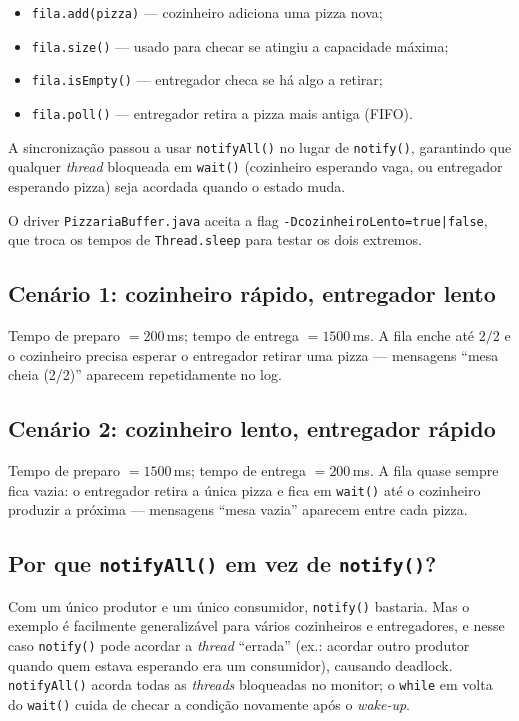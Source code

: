 \begin{itemize}[noitemsep, topsep=2pt, leftmargin=*]
  \item \texttt{fila.add(pizza)} --- cozinheiro adiciona uma pizza nova;
  \item \texttt{fila.size()} --- usado para checar se atingiu a capacidade máxima;
  \item \texttt{fila.isEmpty()} --- entregador checa se há algo a retirar;
  \item \texttt{fila.poll()} --- entregador retira a pizza mais antiga (FIFO).
\end{itemize}

A sincronização passou a usar \texttt{notifyAll()} no lugar de
\texttt{notify()}, garantindo que qualquer \textit{thread} bloqueada em
\texttt{wait()} (cozinheiro esperando vaga, ou entregador esperando
pizza) seja acordada quando o estado muda.

O driver \texttt{PizzariaBuffer.java} aceita a flag
\texttt{-DcozinheiroLento=true|false}, que troca os tempos de
\texttt{Thread.sleep} para testar os dois extremos.

\subsection{Cenário 1: cozinheiro rápido, entregador lento}

Tempo de preparo $= 200$\,ms; tempo de entrega $= 1500$\,ms. A fila
enche até $2/2$ e o cozinheiro precisa esperar o entregador retirar uma
pizza --- mensagens ``mesa cheia (2/2)'' aparecem repetidamente no log.

\subsection{Cenário 2: cozinheiro lento, entregador rápido}

Tempo de preparo $= 1500$\,ms; tempo de entrega $= 200$\,ms. A fila quase
sempre fica vazia: o entregador retira a única pizza e fica em
\texttt{wait()} até o cozinheiro produzir a próxima --- mensagens
``mesa vazia'' aparecem entre cada pizza.

\subsection{Por que \texttt{notifyAll()} em vez de \texttt{notify()}?}

Com um único produtor e um único consumidor, \texttt{notify()} bastaria.
Mas o exemplo é facilmente generalizável para vários cozinheiros e
entregadores, e nesse caso \texttt{notify()} pode acordar a
\textit{thread} ``errada'' (ex.: acordar outro produtor quando quem
estava esperando era um consumidor), causando deadlock.
\texttt{notifyAll()} acorda todas as \textit{threads} bloqueadas no
monitor; o \texttt{while} em volta do \texttt{wait()} cuida de checar a
condição novamente após o \textit{wake-up}.

